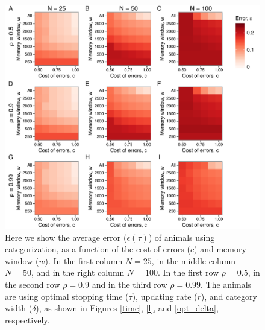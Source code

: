 \begin{figure}
\includegraphics[width=6.85in]{figures/error_heat_maps.pdf}
\caption{\sffamily\small\textbf{} Here we show the average error ($\epsilon(\tau)$) of animals using categorization, as a function of the cost of errors ($c$) and memory window ($w$). In the first column $N=25$, in the middle column $N=50$, and in the right column $N=100$. In the first  row $\rho=0.5$, in the second row $\rho=0.9$ and in the third row $\rho=0.99$. The animals are using optimal stopping time ($\tau$), updating rate ($r$), and category width ($\delta$), as shown in Figures \ref{time}, \ref{l}, and \ref{opt_delta}, respectively. }
\label{error}
\end{figure}

